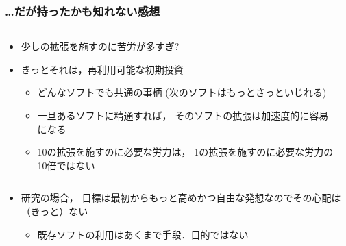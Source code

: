 \documentclass[12pt,dvipdfmx]{beamer}
\newcommand{\ao}[1]{{\color{blue}#1}}
\begin{document}
\begin{frame}
\frametitle{\ldots だが持ったかも知れない感想}
\begin{columns}
\begin{column}{0.65\textwidth}
\begin{itemize}
\item<1-> 少しの拡張を施すのに苦労が多すぎ?
\item<2-> {\scriptsize きっとそれは，}再利用可能な初期投資
  \begin{itemize}
  \item<3-> どんなソフトでも共通の事柄
    \ao{(次のソフトはもっとさっといじれる)}
  \item<4-> 一旦あるソフトに精通すれば，
    そのソフトの拡張は\ao{加速度的に容易になる}
  \item<5-> \ao{10の拡張を施すのに必要な労力は，
    1の拡張を施すのに必要な労力の10倍ではない}
  \end{itemize}
\end{itemize}

\end{column}

\begin{column}{0.35\textwidth}
\begin{center}
%
\end{center}
\end{column}
\end{columns}

\begin{itemize}
\item<6-> 研究の場合，
\ao{目標は最初からもっと高めかつ自由な発想なのでその心配は
（きっと）ない}
\begin{itemize}
\item 既存ソフトの利用はあくまで手段．目的ではない
\end{itemize}
\end{itemize}

\end{frame}
\end{document}
